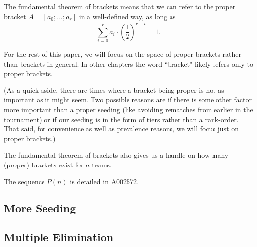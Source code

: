 \documentclass[../main.tex]{subfiles}
\begin{document}
The fundamental theorem of brackets means that we can refer to the proper bracket $A = [a_0; ...; a_r]$ in a well-defined way, as long as $$\sum_{i=0}^r a_i \cdot \left(\frac{1}{2}\right)^{r - i} = 1.$$

For the rest of this paper, we will focus on the space of proper brackets rather than brackets in general. In other chapters the word ``bracket" likely refers only to proper brackets.

(As a quick aside, there are times where a bracket being proper is not as important as it might seem. Two possible reasons are if there is some other factor more important than a proper seeding (like avoiding rematches from earlier in the tournament) or if our seeding is in the form of tiers rather than a rank-order. That said, for convenience as well as prevalence reasons, we will focus just on proper brackets.)

The fundamental theorem of brackets also gives us a handle on how many (proper) brackets exist for $n$ teams:


The sequence $P(n)$ is detailed in \href{https://oeis.org/A002572}{A002572}.



\subsection{More Seeding}
\subsection{Multiple Elimination}
\end{document}

